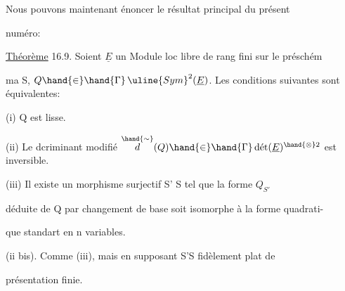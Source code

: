 Nous pouvons maintenant énoncer le résultat principal du présent

numéro:

\uline{Théorème} 16.9. Soient $\underline{E}$ un Module loc libre de rang fini sur le préschém

ma S, $Q \hand{\in}\hand{\Gamma}\,\uline{Sym}^2(\underline{E})$. Les conditions suivantes sont équivalentes:

(i) Q est lisse.

(ii) Le dcriminant modifié $\overset{\hand{\sim}}{d}(Q) \hand{\in}\hand{\Gamma}\,\text{dét}(\underline{E})^{\hand{\otimes}2}$ est inversible.

(iii)  Il existe un morphisme surjectif S' \quad S tel que la forme $Q_{S'}$

déduite de Q par changement de base soit isomorphe à la forme quadrati-%

que standart en n variables.

(ii bis). Comme (iii), mais en supposant S'\hand{$\rightarrow$}S fidèlement plat de

présentation finie.

